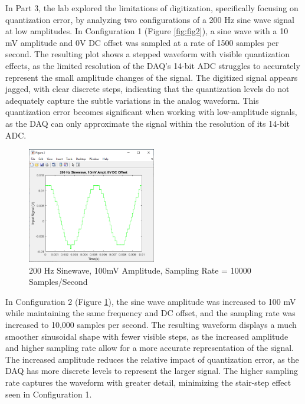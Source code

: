 \documentclass[12pt]{article}
\begin{document}
In Part 3, the lab explored the limitations of digitization, specifically 
focusing on quantization error, by analyzing two configurations of a 200 
Hz sine wave signal at low amplitudes. In Configuration 1 (Figure \ref{fig:fig2}), 
a sine wave with a 10 mV amplitude and 0V DC offset was sampled at a 
rate of 1500 samples per second. The resulting plot shows a stepped 
waveform with visible quantization effects, as the limited resolution 
of the DAQ's 14-bit ADC struggles to accurately represent the small 
amplitude changes of the signal. The digitized signal appears jagged, 
with clear discrete steps, indicating that the quantization levels do 
not adequately capture the subtle variations in the analog waveform. 
This quantization error becomes significant when working with 
low-amplitude signals, as the DAQ can only approximate the signal 
within the resolution of its 14-bit ADC.
\newline

\begin{figure}[H]
	\centering
	\includegraphics[width=0.5\textwidth]{fig 3.2.PNG}
	\caption{200 Hz Sinewave, 100mV Amplitude, Sampling Rate = 10000 Samples/Second}
	\label{fig:fig3}
\end{figure}

In Configuration 2 (Figure \ref{fig:fig3}), the sine wave amplitude was 
increased to 100 mV while maintaining the same frequency and DC offset, 
and the sampling rate was increased to 10,000 samples per second. The 
resulting waveform displays a much smoother sinusoidal shape with fewer 
visible steps, as the increased amplitude and higher sampling rate allow 
for a more accurate representation of the signal. The increased amplitude 
reduces the relative impact of quantization error, as the DAQ has more 
discrete levels to represent the larger signal. The higher sampling rate 
captures the waveform with greater detail, minimizing the stair-step 
effect seen in Configuration 1.
\newline
\end{document}

